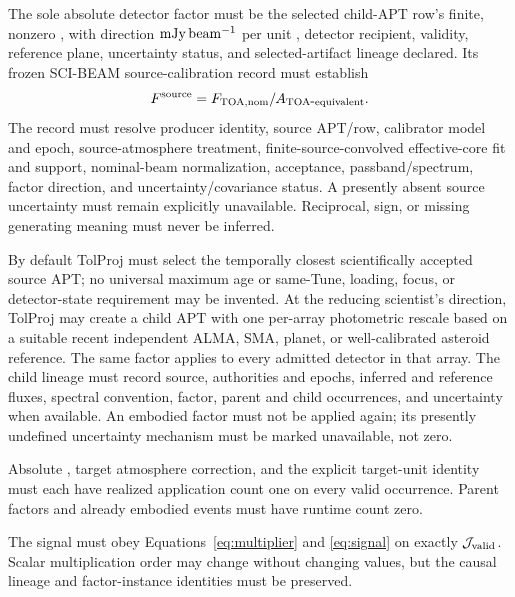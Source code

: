 \begin{description}[style=nextline]
\item[\Req{013}: absolute factor.]
  The sole absolute detector factor must be the selected child-APT row's finite,
  nonzero , with direction \(\mathrm{mJy\,beam^{-1}}\) per unit , detector recipient,
  validity, reference plane, uncertainty status, and selected-artifact lineage
  declared. Its frozen SCI-BEAM source-calibration record must establish
  \begin{equation*}
  F^{\rm source}=F_{\rm TOA,nom}/A_{\rm TOA\mbox{-}equivalent}.
  \end{equation*}
  The record must resolve producer identity, source APT/row, calibrator model and epoch,
  source-atmosphere treatment, finite-source-convolved effective-core fit and
  support, nominal-beam normalization, acceptance, passband/spectrum, factor
  direction, and uncertainty/covariance status. A presently absent source
   uncertainty must remain explicitly unavailable.
  Reciprocal, sign, or missing generating meaning must never be inferred.

\item[\Req{014}: pointing-correction disposition.]
  By default TolProj must select the temporally closest scientifically
  accepted source APT; no universal maximum age or same-Tune, loading, focus,
  or detector-state requirement may be invented. At the reducing scientist's
  direction, TolProj may create a child APT with one per-array photometric
  rescale based on a suitable recent independent ALMA, SMA, planet, or
  well-calibrated asteroid reference. The same factor applies to every
  admitted detector in that array. The child lineage must record source,
  authorities and epochs, inferred and reference fluxes, spectral convention,
  factor, parent and child occurrences, and uncertainty when available. An
  embodied factor must not be applied again; its presently undefined
  uncertainty mechanism must be marked unavailable, not zero.

\item[\Req{015}: once-only application.]
  Absolute , target atmosphere correction, and the explicit
  target-unit identity must each have realized application count one on every
  valid occurrence. Parent factors and already embodied events must have
  runtime count zero.

\item[\Req{016}: canonical multiplier.]
  The signal must obey Equations~\eqref{eq:multiplier} and
  \eqref{eq:signal} on exactly \(\mathcal{J}_{\mathrm{valid}}\). Scalar multiplication order may
  change without changing values, but the causal lineage and factor-instance
  identities must be preserved.


\end{description}
